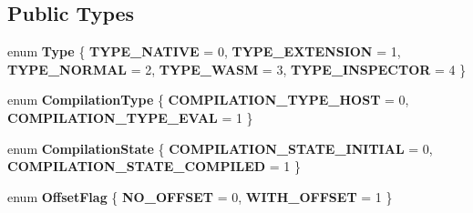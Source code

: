 \subsection*{Public Types}
\begin{DoxyCompactItemize}
\item 
\mbox{\label{classv8_1_1internal_1_1Script_ab293a016cf807eed21d94c4eb8b5d3a4}} 
enum {\bfseries Type} \{ \newline
{\bfseries T\+Y\+P\+E\+\_\+\+N\+A\+T\+I\+VE} = 0, 
{\bfseries T\+Y\+P\+E\+\_\+\+E\+X\+T\+E\+N\+S\+I\+ON} = 1, 
{\bfseries T\+Y\+P\+E\+\_\+\+N\+O\+R\+M\+AL} = 2, 
{\bfseries T\+Y\+P\+E\+\_\+\+W\+A\+SM} = 3, 
\newline
{\bfseries T\+Y\+P\+E\+\_\+\+I\+N\+S\+P\+E\+C\+T\+OR} = 4
 \}
\item 
\mbox{\label{classv8_1_1internal_1_1Script_ad5ba2ef0105d489f8e29013ad262f584}} 
enum {\bfseries Compilation\+Type} \{ {\bfseries C\+O\+M\+P\+I\+L\+A\+T\+I\+O\+N\+\_\+\+T\+Y\+P\+E\+\_\+\+H\+O\+ST} = 0, 
{\bfseries C\+O\+M\+P\+I\+L\+A\+T\+I\+O\+N\+\_\+\+T\+Y\+P\+E\+\_\+\+E\+V\+AL} = 1
 \}
\item 
\mbox{\label{classv8_1_1internal_1_1Script_a365b68632fc01a8bbae09764f6a0c2d5}} 
enum {\bfseries Compilation\+State} \{ {\bfseries C\+O\+M\+P\+I\+L\+A\+T\+I\+O\+N\+\_\+\+S\+T\+A\+T\+E\+\_\+\+I\+N\+I\+T\+I\+AL} = 0, 
{\bfseries C\+O\+M\+P\+I\+L\+A\+T\+I\+O\+N\+\_\+\+S\+T\+A\+T\+E\+\_\+\+C\+O\+M\+P\+I\+L\+ED} = 1
 \}
\item 
\mbox{\label{classv8_1_1internal_1_1Script_a0edc7fb48dd6e3850d1819daeb188191}} 
enum {\bfseries Offset\+Flag} \{ {\bfseries N\+O\+\_\+\+O\+F\+F\+S\+ET} = 0, 
{\bfseries W\+I\+T\+H\+\_\+\+O\+F\+F\+S\+ET} = 1
 \}
\end{DoxyCompactItemize}

